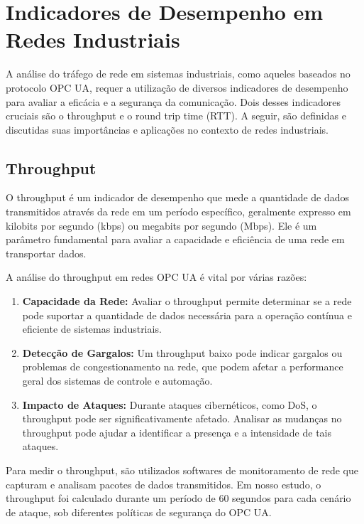    {\color{red}
    \section{Indicadores de Desempenho em Redes Industriais}

    A análise do tráfego de rede em sistemas industriais, como aqueles baseados no protocolo OPC UA, requer a utilização de diversos indicadores de desempenho para avaliar a eficácia e a segurança da comunicação. Dois desses indicadores cruciais são o throughput e o round trip time (RTT). A seguir, são definidas e discutidas suas importâncias e aplicações no contexto de redes industriais.

    \subsection{Throughput}

    O throughput é um indicador de desempenho que mede a quantidade de dados transmitidos através da rede em um período específico, geralmente expresso em kilobits por segundo (kbps) ou megabits por segundo (Mbps). Ele é um parâmetro fundamental para avaliar a capacidade e eficiência de uma rede em transportar dados.

    A análise do throughput em redes OPC UA é vital por várias razões:

    \begin{enumerate}
        \item \textbf{Capacidade da Rede:} Avaliar o throughput permite determinar se a rede pode suportar a quantidade de dados necessária para a operação contínua e eficiente de sistemas industriais.
        \item \textbf{Detecção de Gargalos:} Um throughput baixo pode indicar gargalos ou problemas de congestionamento na rede, que podem afetar a performance geral dos sistemas de controle e automação.
        \item \textbf{Impacto de Ataques:} Durante ataques cibernéticos, como DoS, o throughput pode ser significativamente afetado. Analisar as mudanças no throughput pode ajudar a identificar a presença e a intensidade de tais ataques.
    \end{enumerate}

    Para medir o throughput, são utilizados softwares de monitoramento de rede que capturam e analisam pacotes de dados transmitidos. Em nosso estudo, o throughput foi calculado durante um período de 60 segundos para cada cenário de ataque, sob diferentes políticas de segurança do OPC UA.

}
